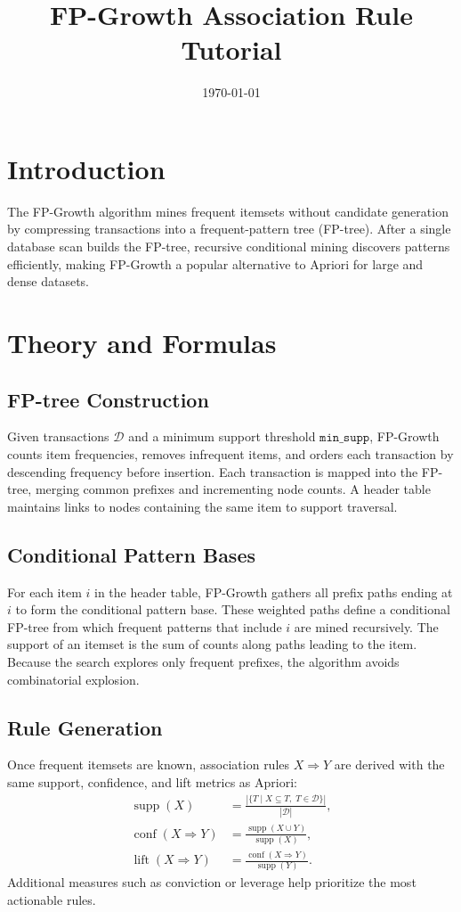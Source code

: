 ﻿\documentclass[12pt]{article}
\title{FP-Growth Association Rule Tutorial}
\author{}
\date{\today}
\begin{document}
\maketitle

\section{Introduction}
The FP-Growth algorithm mines frequent itemsets without candidate generation by compressing transactions into a frequent-pattern tree (FP-tree). After a single database scan builds the FP-tree, recursive conditional mining discovers patterns efficiently, making FP-Growth a popular alternative to Apriori for large and dense datasets.

\section{Theory and Formulas}
\subsection{FP-tree Construction}
Given transactions \(\mathcal{D}\) and a minimum support threshold \(\texttt{min\_supp}\), FP-Growth counts item frequencies, removes infrequent items, and orders each transaction by descending frequency before insertion. Each transaction is mapped into the FP-tree, merging common prefixes and incrementing node counts. A header table maintains links to nodes containing the same item to support traversal.

\subsection{Conditional Pattern Bases}
For each item \(i\) in the header table, FP-Growth gathers all prefix paths ending at \(i\) to form the conditional pattern base. These weighted paths define a conditional FP-tree from which frequent patterns that include \(i\) are mined recursively. The support of an itemset is the sum of counts along paths leading to the item. Because the search explores only frequent prefixes, the algorithm avoids combinatorial explosion.

\subsection{Rule Generation}
Once frequent itemsets are known, association rules \(X \Rightarrow Y\) are derived with the same support, confidence, and lift metrics as Apriori:
\begin{align}
\operatorname{supp}(X) &= \frac{\left|\{ T \mid X \subseteq T,\; T \in \mathcal{D}\}\right|}{|\mathcal{D}|},\\
\operatorname{conf}(X \Rightarrow Y) &= \frac{\operatorname{supp}(X \cup Y)}{\operatorname{supp}(X)},\\
\operatorname{lift}(X \Rightarrow Y) &= \frac{\operatorname{conf}(X \Rightarrow Y)}{\operatorname{supp}(Y)}.
\end{align}
Additional measures such as conviction or leverage help prioritize the most actionable rules.
\end{document}
